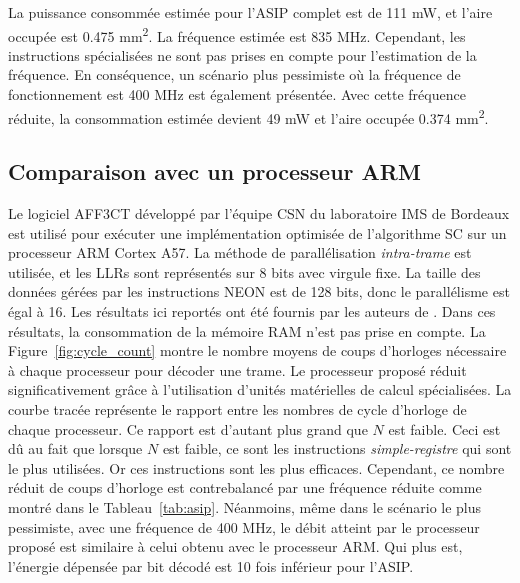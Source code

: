 La puissance consommée estimée pour l'ASIP complet est de 111 mW, et l'aire occupée est 0.475 mm\textsuperscript{2}. La fréquence estimée est 835 MHz. Cependant, les instructions spécialisées ne sont pas prises en compte pour l'estimation de la fréquence. En conséquence, un scénario plus pessimiste où la fréquence de fonctionnement est 400 MHz est également présentée. Avec cette fréquence réduite, la consommation estimée devient 49 mW et l'aire occupée 0.374 mm\textsuperscript{2}.

\subsection{Comparaison avec un processeur ARM}

Le logiciel AFF3CT développé par l'équipe CSN du laboratoire IMS de Bordeaux est utilisé pour exécuter une implémentation optimisée de l'algorithme SC sur un processeur ARM Cortex A57. La méthode de parallélisation \textit{intra-trame} est utilisée, et les LLRs sont représentés sur 8 bits avec virgule fixe. La taille des données gérées par les instructions NEON est de 128 bits, donc le parallélisme est égal à 16. Les résultats ici reportés ont été fournis par les auteurs de \cite{cassagne_energy_2016}. Dans ces résultats, la consommation de la mémoire RAM n'est pas prise en compte.
La Figure~\ref{fig:cycle_count} montre le nombre moyens de coups d'horloges nécessaire à chaque processeur pour décoder une trame. Le processeur proposé réduit significativement grâce à l'utilisation d'unités matérielles de calcul spécialisées. La courbe tracée représente le rapport entre les nombres de cycle d'horloge de chaque processeur. Ce rapport est d'autant plus grand que $N$ est faible. Ceci est dû au fait que lorsque $N$ est faible, ce sont les instructions \textit{simple-registre} qui sont le plus utilisées. Or ces instructions sont les plus efficaces.
Cependant, ce nombre réduit de coups d'horloge est contrebalancé par une fréquence réduite comme montré dans le Tableau~\ref{tab:asip}. Néanmoins, même dans le scénario le plus pessimiste, avec une fréquence de 400 MHz, le débit atteint par le processeur proposé est similaire à celui obtenu avec le processeur ARM. Qui plus est, l'énergie dépensée par bit décodé est 10 fois inférieur pour l'ASIP.

